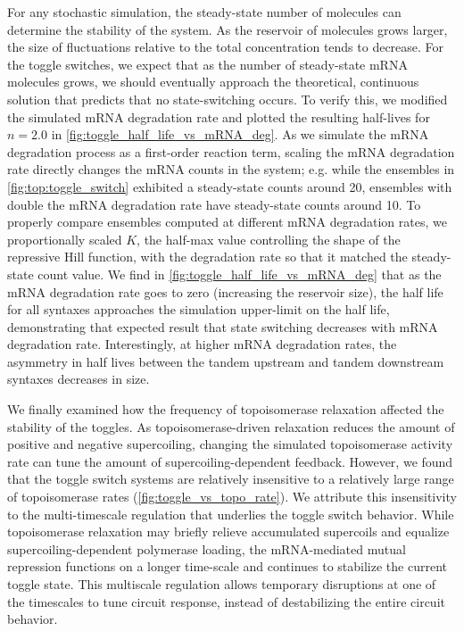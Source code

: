 \documentclass[11pt]{article}
\begin{document}
For any stochastic simulation, the steady-state number of molecules can determine the stability of the system. As the reservoir of molecules grows larger, the size of fluctuations relative to the total concentration tends to decrease. For the toggle switches, we expect that as the number of steady-state mRNA molecules grows, we should eventually approach the theoretical, continuous solution that predicts that no state-switching occurs. To verify this, we modified the simulated mRNA degradation rate and plotted the resulting half-lives for \(n = 2.0\) in \cref{fig:toggle_half_life_vs_mRNA_deg}. As we simulate the mRNA degradation process as a first-order reaction term, scaling the mRNA degradation rate directly changes the mRNA counts in the system; e.g. while the ensembles in \cref{fig:top:toggle_switch} exhibited a steady-state counts around 20, ensembles with double the mRNA degradation rate have steady-state counts around 10. To properly compare ensembles computed at different mRNA degradation rates, we proportionally scaled \(K\), the half-max value controlling the shape of the repressive Hill function, with the degradation rate so that it matched the steady-state count value. We find in \cref{fig:toggle_half_life_vs_mRNA_deg} that as the mRNA degradation rate goes to zero (increasing the reservoir size), the half life for all syntaxes approaches the simulation upper-limit on the half life, demonstrating that expected result that state switching decreases with mRNA degradation rate. Interestingly, at higher mRNA degradation rates, the asymmetry in half lives between the tandem upstream and tandem downstream syntaxes decreases in size.

We finally examined how the frequency of topoisomerase relaxation affected the stability of the toggles. As topoisomerase-driven relaxation reduces the amount of positive and negative supercoiling, changing the simulated topoisomerase activity rate can tune the amount of supercoiling-dependent feedback. However, we found that the toggle switch systems are relatively insensitive to a relatively large range of topoisomerase rates (\cref{fig:toggle_vs_topo_rate}). We attribute this insensitivity to the multi-timescale regulation that underlies the toggle switch behavior. While topoisomerase relaxation may briefly relieve accumulated supercoils and equalize supercoiling-dependent polymerase loading, the mRNA-mediated mutual repression functions on a longer time-scale and continues to stabilize the current toggle state. This multiscale regulation allows temporary disruptions at one of the timescales to tune circuit response, instead of destabilizing the entire circuit behavior.
\end{document}

